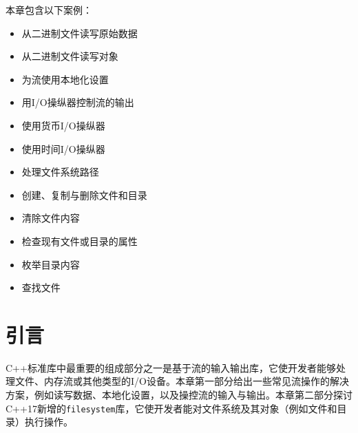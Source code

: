 
本章包含以下案例：



\begin{itemize}
\item 从二进制文件读写原始数据



\item 从二进制文件读写对象



\item 为流使用本地化设置



\item 用I/O操纵器控制流的输出



\item 使用货币I/O操纵器



\item 使用时间I/O操纵器



\item 处理文件系统路径



\item 创建、复制与删除文件和目录



\item 清除文件内容



\item 检查现有文件或目录的属性



\item 枚举目录内容



\item 查找文件

\end{itemize}



\section{引言}



C++标准库中最重要的组成部分之一是基于流的输入输出库，它使开发者能够处理文件、内存流或其他类型的I/O设备。本章第一部分给出一些常见流操作的解决方案，例如读写数据、本地化设置，以及操控流的输入与输出。本章第二部分探讨C++17新增的\texttt{filesystem}库，它使开发者能对文件系统及其对象（例如文件和目录）执行操作。



